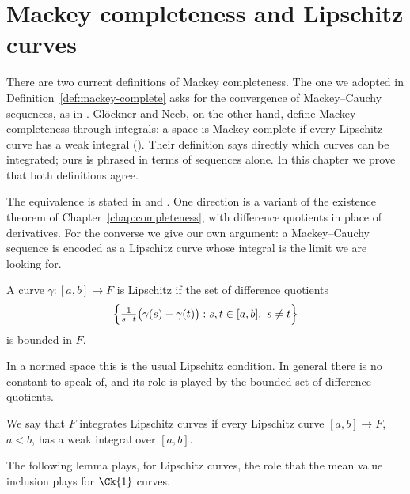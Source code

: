 \chapter{Mackey completeness and Lipschitz curves}
\label{chap:mackey-lipschitz}

There are two current definitions of Mackey completeness. The one we adopted in
Definition~\ref{def:mackey-complete} asks for the convergence of Mackey--Cauchy sequences, as
in \cite[2.2]{KM97}. Glöckner and Neeb, on the other hand, define Mackey completeness through
integrals: a space is Mackey complete if every Lipschitz curve has a weak integral
(\cite[1.1.17(b)]{GN26}). Their definition says directly which curves can be integrated; ours is
phrased in terms of sequences alone. In this chapter we prove that both definitions agree.

The equivalence is stated in \cite[1.1.18(e)]{GN26} and \cite[2.14]{KM97}. One direction is a variant
of the existence theorem of Chapter~\ref{chap:completeness}, with difference quotients in place
of derivatives. For the converse we give our own argument: a Mackey--Cauchy sequence is encoded
as a Lipschitz curve whose integral is the limit we are looking for.

\begin{definition}
  \label{def:lipschitz}
  \leanok
  A curve $\gamma \colon [a, b] \to F$ is Lipschitz if the set of difference quotients
  \[
    \Bigl\{ \tfrac{1}{s - t}\bigl(\gamma(s) - \gamma(t)\bigr) : s, t \in [a, b],\ s \neq t \Bigr\}
  \]
  is bounded in $F$.
\end{definition}

In a normed space this is the usual Lipschitz condition. In general there is no constant to
speak of, and its role is played by the bounded set of difference quotients.

\begin{definition}
  \label{def:integrates-lipschitz}
  \leanok
  We say that $F$ integrates Lipschitz curves if every Lipschitz curve $[a, b] \to F$, $a < b$,
  has a weak integral over $[a, b]$.
\end{definition}

The following lemma plays, for Lipschitz curves, the role that the mean value inclusion plays
for $\Ck{1}$ curves.


